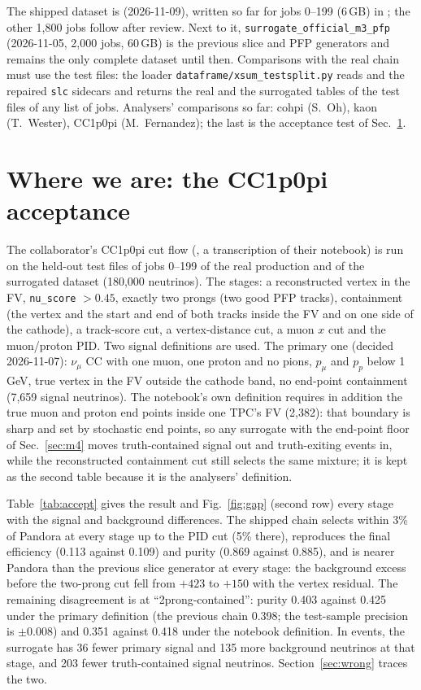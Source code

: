 \documentclass[11pt]{article}
\newcommand{\real}{Pandora}
\begin{document}
The shipped dataset is  (2026-11-09), written so far for jobs 0--199
(6\,GB) in ; the other
1,800 jobs follow after review. Next to it, \texttt{surrogate\_official\_m3\_pfp} (2026-11-05, 2,000 jobs,
60\,GB) is the previous slice and PFP generators and remains the only complete dataset until then. Comparisons
with the real chain must use the test files: the loader \texttt{dataframe/xsum\_testsplit.py} reads
 and the repaired \texttt{slc} sidecars and returns the real and the
surrogated tables of the test files of any list of jobs. Analysers' comparisons so far: cohpi (S.~Oh), kaon
(T.~Wester), CC1p0pi (M.~Fernandez); the last is the acceptance test of Sec.~\ref{sec:where}.

\section{Where we are: the CC1p0pi acceptance}
\label{sec:where}

The collaborator's CC1p0pi cut flow (, a transcription of their
notebook) is run on the held-out test files of jobs 0--199 of the real production and of the surrogated dataset
(180,000 neutrinos). The stages: a reconstructed vertex in the FV, \texttt{nu\_score} $>0.45$, exactly two prongs
(two good PFP tracks), containment (the vertex and the start and end of both tracks inside the FV and on one side of
the cathode), a track-score cut, a vertex-distance cut, a muon $x$ cut and the muon/proton PID. Two signal
definitions are used. The primary one (decided 2026-11-07): $\nu_\mu$ CC with one muon, one proton and no pions,
$p_\mu$ and $p_p$ below 1\,GeV, true vertex in the FV outside the cathode band, no end-point containment (7,659
signal neutrinos). The notebook's own definition requires in addition the true muon and proton end points inside
one TPC's FV (2,382): that boundary is sharp and set by stochastic end points, so any surrogate with the
end-point floor of Sec.~\ref{sec:m4} moves truth-contained signal out and truth-exiting events in, while the
reconstructed containment cut still selects the same mixture; it is kept as the second table because it is the
analysers' definition.

Table~\ref{tab:accept} gives the result and Fig.~\ref{fig:gap} (second row) every stage with the signal and
background differences. The shipped chain selects within 3\% of \real{} at every stage up to the PID cut (5\%
there), reproduces the final efficiency (0.113 against 0.109) and purity (0.869 against 0.885), and is nearer
\real{} than the previous slice generator at every stage: the background excess before the two-prong cut fell
from $+423$ to $+150$ with the vertex residual. The remaining disagreement is at ``2prong-contained'': purity
0.403 against 0.425 under the primary definition (the previous chain 0.398; the test-sample precision is
$\pm0.008$) and 0.351 against 0.418 under the notebook definition. In events, the surrogate has 36 fewer primary
signal and 135 more background neutrinos at that stage, and 203 fewer truth-contained signal neutrinos.
Section~\ref{sec:wrong} traces the two.
\end{document}
